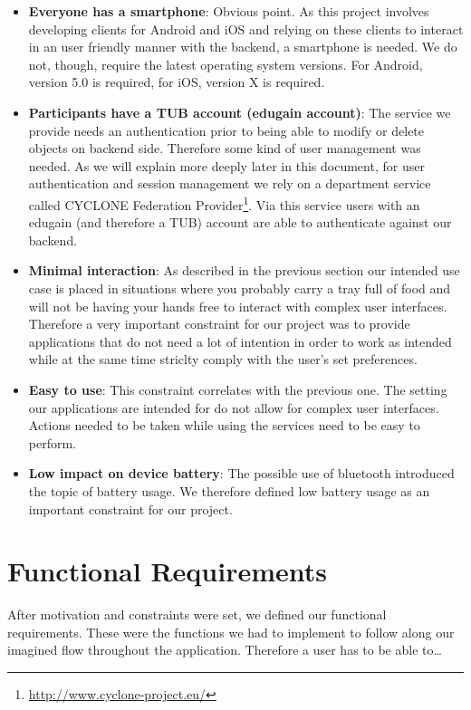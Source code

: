 \begin{itemize}
    \item \textbf{Everyone has a smartphone}: Obvious point. As this project involves developing clients for Android and iOS and relying on these clients to interact in an user friendly manner with the backend, a smartphone is needed. We do not, though, require the latest operating system versions. For Android, version 5.0 is required, for iOS, version X is required.
    \item \textbf{Participants have a TUB account (edugain account)}: The service we provide needs an authentication prior to being able to modify or delete objects on backend side. Therefore some kind of user management was needed. As we will explain more deeply later in this document, for user authentication and session management we rely on a department service called CYCLONE Federation Provider\footnote{\url{http://www.cyclone-project.eu/}}. Via this service users with an edugain (and therefore a TUB) account are able to authenticate against our backend.
    \item \textbf{Minimal interaction}: As described in the previous section our intended use case is placed in situations where you probably carry a tray full of food and will not be having your hands free to interact with complex user interfaces. Therefore a very important constraint for our project was to provide applications that do not need a lot of intention in order to work as intended while at the same time striclty comply with the user's set preferences.
    \item \textbf{Easy to use}: This constraint correlates with the previous one. The setting our applications are intended for do not allow for complex user interfaces. Actions needed to be taken while using the services need to be easy to perform.
    \item \textbf{Low impact on device battery}: The possible use of bluetooth introduced the topic of battery usage. We therefore defined low battery usage as an important constraint for our project.
\end{itemize}


\vspace{0.5cm}

\section{Functional Requirements}

After motivation and constraints were set, we defined our functional requirements. These were the functions we had to implement to follow along our imagined flow throughout the application. Therefore a user has to be able to\ldots

